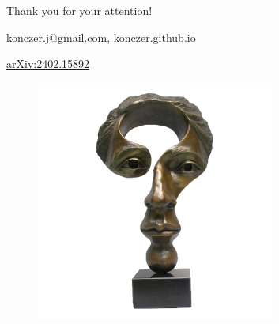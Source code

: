 \documentclass{beamer}
\theoremstyle{definition}
\begin{document}
\begin{frame}{}

\centering \Huge
  {Thank you for your attention!}

    \vspace{0.85 cm}
    

    \vspace{0.85 cm}

    {\large
  \href{mailto:konczer.j@gmail.com}{konczer.j@gmail.com},
        \href{https://konczer.github.io/}{konczer.github.io}

        \href{https://arxiv.org/abs/2402.15892}{arXiv:2402.15892}
     }   
  
\end{frame}

\begin{frame}{}

\begin{figure}[H]
    \centering
    \includegraphics[width=0.7\textwidth]{img/QuestioningMind.png}
\end{figure}

\end{frame}
\end{document}

